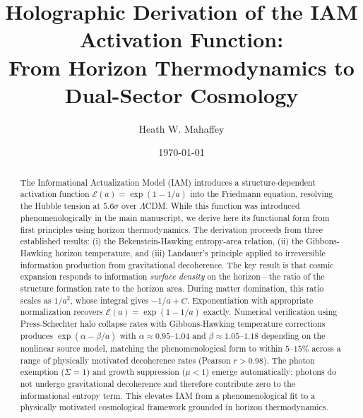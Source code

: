 \documentclass[twocolumn,superscriptaddress,prl,amsmath,amssymb]{revtex4-2}
\begin{document}
\title{Holographic Derivation of the IAM Activation Function:\\From Horizon Thermodynamics to Dual-Sector Cosmology}

\author{Heath W. Mahaffey}

\date{\today}

\begin{abstract}
The Informational Actualization Model (IAM) introduces a structure-dependent activation function $\mathcal{E}(a) = \exp(1 - 1/a)$ into the Friedmann equation, resolving the Hubble tension at $5.6\sigma$ over $\Lambda$CDM. While this function was introduced phenomenologically in the main manuscript, we derive here its functional form from first principles using horizon thermodynamics. The derivation proceeds from three established results: (i) the Bekenstein-Hawking entropy-area relation, (ii) the Gibbons-Hawking horizon temperature, and (iii) Landauer's principle applied to irreversible information production from gravitational decoherence. The key result is that cosmic expansion responds to information \textit{surface density} on the horizon---the ratio of the structure formation rate to the horizon area. During matter domination, this ratio scales as $1/a^2$, whose integral gives $-1/a + C$. Exponentiation with appropriate normalization recovers $\mathcal{E}(a) = \exp(1 - 1/a)$ exactly. Numerical verification using Press-Schechter halo collapse rates with Gibbons-Hawking temperature corrections produces $\exp(\alpha - \beta/a)$ with $\alpha \approx 0.95$--$1.04$ and $\beta \approx 1.05$--$1.18$ depending on the nonlinear source model, matching the phenomenological form to within $5$--$15\%$ across a range of physically motivated decoherence rates (Pearson $r > 0.98$). The photon exemption ($\Sigma = 1$) and growth suppression ($\mu < 1$) emerge automatically: photons do not undergo gravitational decoherence and therefore contribute zero to the informational entropy term. This elevates IAM from a phenomenological fit to a physically motivated cosmological framework grounded in horizon thermodynamics.
\end{abstract}

\maketitle

\end{document}
